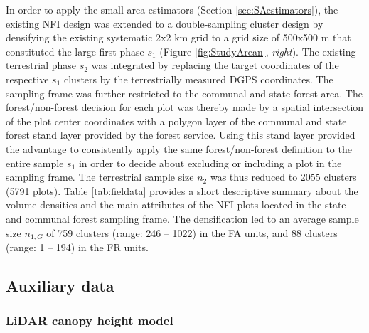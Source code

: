 \documentclass[remotesensing,article,submit,moreauthors,pdftex,10pt,a4paper]{mdpi}
\begin{document}
In order to apply the small area estimators (Section \ref{sec:SAestimators}), the existing NFI design was extended to a double-sampling cluster design by densifying the existing systematic 2x2 km grid to a grid size of 500x500 m that constituted the large first phase $s_1$ (Figure \ref{fig:StudyArean}, \textit{right}). The existing terrestrial phase $s_2$ was integrated by replacing the target coordinates of the respective $s_1$ clusters by the terrestrially measured DGPS coordinates. The sampling frame was further restricted to the communal and state forest area. The forest/non-forest decision for each plot was thereby made by a spatial intersection of the plot center coordinates with a polygon layer of the communal and state forest stand layer provided by the forest service. Using this stand layer provided the advantage to consistently apply the same forest/non-forest definition to the entire sample $s_1$ in order to decide about excluding or including a plot in the sampling frame. The terrestrial sample size $n_2$ was thus reduced to 2055 clusters (5791 plots). Table \ref{tab:fieldata} provides a short descriptive summary about the volume densities and the main attributes of the NFI plots located in the state and communal forest sampling frame. The densification led to an average sample size $n_{1,G}$ of 759  clusters (range: 246 -- 1022) in the FA units, and 88 clusters (range: 1 -- 194) in the FR units.




\subsection{Auxiliary data}
\label{sec:auxinfo}

\subsubsection{LiDAR canopy height model}
\label{sec:chm}
\end{document}

